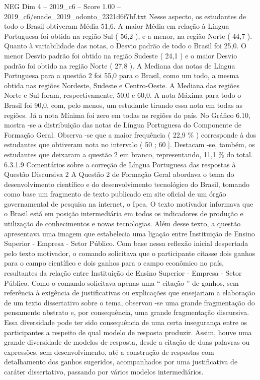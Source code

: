 \begin{textsample}{NEG Dim 4 – 2019\_c6 – Score 1.00 – 2019\_c6/enade\_2019\_odonto\_2321d6f7bf.txt}
Nesse aspecto, os estudantes de todo o Brasil obtiveram Média 51,6.
A maior Média em relação à Língua Portuguesa foi obtida na região Sul ( 56,2 ), e a menor, na região Norte ( 44,7 ).
Quanto à variabilidade das notas, o Desvio padrão de todo o Brasil foi 25,0.
O menor Desvio padrão foi obtido na região Sudeste ( 24,1 ) e o maior Desvio padrão foi obtido na região Norte ( 27,8 ).
A Mediana das notas de Língua Portuguesa para a questão 2 foi 55,0 para o Brasil, como um todo, a mesma obtida nas regiões Nordeste, Sudeste e Centro-Oeste.
A Mediana das regiões Norte e Sul foram, respectivamente, 50,0 e 60,0.
A nota Máxima para todo o Brasil foi 90,0, com, pelo menos, um estudante tirando essa nota em todas as regiões.
Já a nota Mínima foi zero em todas as regiões do país.
No Gráfico 6.10, mostra -se a distribuição das notas de Língua Portuguesa do Componente de Formação Geral.
Observa -se que a maior frequência ( 22,9 \% ) corresponde à dos estudantes que obtiveram nota no intervalo ( 50 ; 60 ].
Destacam -se, também, os estudantes que deixaram a questão 2 em branco, representando, 11,1 \% do total. 6.3.1.9 Comentários sobre a correção de Língua Portuguesa das respostas à Questão Discursiva 2 A Questão 2 de Formação Geral abordava o tema do desenvolvimento científico e do desenvolvimento tecnológico do Brasil, tomando como base um fragmento de texto publicado em site oficial de um órgão governamental de pesquisa na internet, o Ipea.
O texto motivador informava que o Brasil está em posição intermediária em todos os indicadores de produção e utilização de conhecimentos e novas tecnologias.
Além desse texto, a questão apresentava uma imagem que estabelecia uma ligação entre Instituição de Ensino Superior - Empresa - Setor Público.
Com base nessa reflexão inicial despertada pelo texto motivador, o comando solicitava que o participante citasse dois ganhos para o campo científico e dois ganhos para o campo econômico no país, resultantes da relação entre Instituição de Ensino Superior - Empresa - Setor Público.
Como o comando solicitava apenas uma “ citação ” de ganhos, sem referência à exigência de justificativas ou explicações que ensejariam a elaboração de um texto dissertativo sobre o tema, observou -se uma grande fragmentação do pensamento abstrato e, por consequência, uma grande fragmentação discursiva.
Essa diversidade pode ter sido consequência de uma certa insegurança entre os participantes a respeito de qual modelo de resposta produzir.
Assim, houve uma grande diversidade de modelos de resposta, desde a citação de duas palavras ou expressões, sem desenvolvimento, até a construção de respostas com detalhamento dos ganhos sugeridos, acompanhados por uma justificativa de caráter dissertativo, passando por vários modelos intermediários.

\end{textsample}
